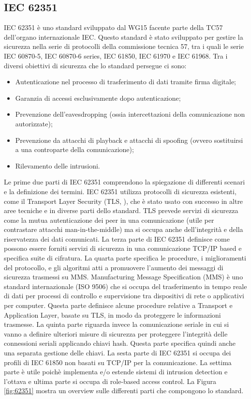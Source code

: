 \subsection{IEC 62351}
IEC 62351 è uno standard sviluppato dal WG15 facente parte della TC57 dell'organo internazionale IEC. Questo standard è stato sviluppato per gestire la sicurezza nella serie di protocolli della commissione tecnica 57, tra i quali le serie IEC 60870-5, IEC 60870-6 series, IEC 61850, IEC 61970 e IEC 61968. Tra i diversi obiettivi di sicurezza che lo standard persegue ci sono:
\begin{itemize}
	\item Autenticazione nel processo di trasferimento di dati tramite firma digitale;
	\item Garanzia di accessi esclusivamente dopo autenticazione;
	\item Prevenzione dell'eavesdropping (ossia intercettazioni della comunicazione non autorizzate);
	\item Prevenzione da attacchi di playback e attacchi di spoofing (ovvero sostituirsi a una controparte della comunicazione);
	\item Rilevamento delle intrusioni.
\end{itemize}
Le prime due parti di IEC 62351 comprendono la spiegazione di differenti scenari e la definizione dei termini. IEC 62351 utilizza protocolli di sicurezza esistenti, come il Transport Layer Security (TLS, \cite{tls}), che è stato usato con successo in altre aree tecniche e in diverse parti dello standard. TLS prevede servizi di sicurezza come la mutua autenticazione dei peer in una comunicazione (utile per contrastare attacchi man-in-the-middle) ma si occupa anche dell'integrità e della riservatezza dei dati comunicati. La terza parte di IEC 62351 definisce come possono essere forniti servizi di sicurezza in una  comunicazione TCP/IP based e specifica suite di cifratura. La quarta parte specifica le procedure, i miglioramenti del protocollo, e gli algoritmi atti a promuovere l'aumento dei messaggi di sicurezza trasmessi su MMS. Manufacturing Message Specification (MMS) è uno standard internazionale (ISO 9506) che si occupa del trasferimento in tempo reale di dati per processi di controllo e supervisione tra dispositivi di rete o applicativi per computer. Questa parte definisce alcune procedure relative a Transport e Application Layer, basate su TLS, in modo da proteggere le informazioni trasmesse. La quinta parte riguarda invece la comunicazione seriale in cui si vanno a definire ulteriori misure di sicurezza per proteggere l'integrità delle connessioni seriali applicando chiavi hash. Questa parte specifica quindi anche una separata gestione delle chiavi. La sesta parte di IEC 62351 si occupa dei profili di IEC 61850 non basati su TCP/IP per la comunicazione. La settima parte è utile poichè implementa e/o estende sistemi di intrusion detection e l'ottava e ultima parte si occupa di role-based access control. La Figura \ref{fig:62351} mostra un overview sulle differenti parti che compongono lo standard.

